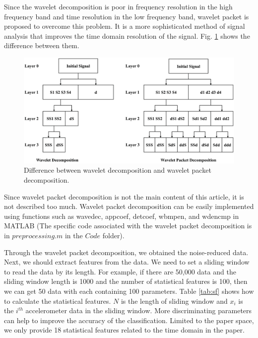 \documentclass{bioinfo}
\begin{document}
Since the wavelet decomposition \cite{Walczak1997Noise} is poor in frequency resolution in the high frequency band and time resolution in the low frequency band, wavelet packet is proposed to overcome this problem. It is a more sophisticated method of signal analysis that improves the time domain resolution of the signal. Fig. \ref{fig:wpd} shows the difference between them.

\begin{figure}[htbp]
	\centering
	\includegraphics[width=\columnwidth]{wpd.eps}
	\caption{Difference between wavelet decomposition and wavelet packet decomposition.}
	\label{fig:wpd}
\end{figure}

Since wavelet packet decomposition is not the main content of this article, it is not described too much. Wavelet packet decomposition can be easily implemented using functions such as wavedec, appcoef, detcoef, wbmpen, and wdencmp in MATLAB (The specific code associated with the wavelet packet decomposition is in $preprocessing.m$ in the $Code$ folder).

Through the wavelet packet decomposition, we obtained the noise-reduced data. Next, we should extract features from the data. We need to set a sliding window to read the data by its length. For example, if there are 50,000 data and the sliding window length is 1000 and the number of statistical features is 100, then we can get 50 data with each containing 100 parameters. Table \ref{tab:sf} shows how to calculate the statistical features. $N$ is the length of sliding window and $x_i$ is the $i^{th}$ accelerometer data in the sliding window. More discriminating parameters can help to improve the accuracy of the classification. Limited to the paper space, we only provide 18 statistical features related to the time domain in the paper.
\end{document}
